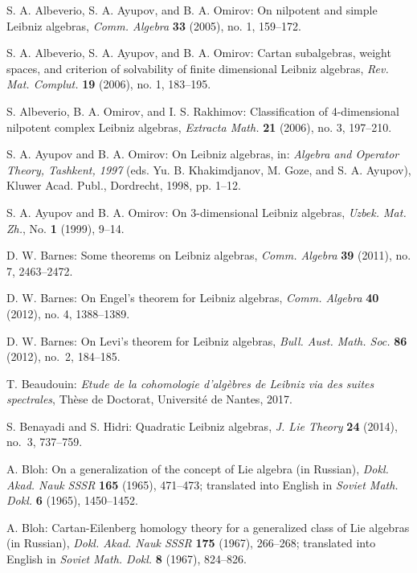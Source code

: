 \documentclass{amsart}
\numberwithin{equation}{section}
\begin{document}
\begin{thebibliography}{99}


S. A. Albeverio, S. A. Ayupov, and B. A. Omirov:
On nilpotent and simple Leibniz algebras,
{\it Comm. Algebra\/} {\bf 33} (2005), no. 1, 159--172.

S. A. Albeverio, S. A. Ayupov, and B. A. Omirov:
Cartan subalgebras, weight spaces, and criterion of solvability of finite dimensional Leibniz algebras,
{\it Rev. Mat. Complut.\/} {\bf 19} (2006), no. 1, 183--195.

S. Albeverio, B. A. Omirov, and I. S. Rakhimov:
Classification of 4-dimensional nilpotent complex Leibniz algebras,
{\it Extracta Math.\/} {\bf 21} (2006), no. 3, 197--210.

S. A. Ayupov and B. A. Omirov:
On Leibniz algebras,
in: {\it Algebra and Operator Theory, Tashkent, 1997\/}
(eds. Yu. B. Khakimdjanov, M. Goze, and S. A. Ayupov),
Kluwer Acad. Publ., Dordrecht, 1998, pp. 1--12.

S. A. Ayupov and B. A. Omirov:
On 3-dimensional Leibniz algebras,
{\it Uzbek. Mat. Zh.\/}, No. {\bf 1} (1999), 9--14.

D. W. Barnes:
Some theorems on Leibniz algebras,
{\it Comm. Algebra\/} {\bf 39} (2011), no. 7, 2463--2472.

D. W. Barnes:
On Engel's theorem for Leibniz algebras,
{\it Comm. Algebra\/} {\bf 40} (2012), no. 4, 1388--1389.

D. W. Barnes:
On Levi's theorem for Leibniz algebras,
{\it Bull. Aust. Math. Soc.\/} {\bf 86} (2012), no.~2, 184--185.

T. Beaudouin:
{\it Etude de la cohomologie d'alg\`ebres de Leibniz via des suites spectrales\/},
Th\`ese de Doctorat, Universit\'e de Nantes, 2017.

S. Benayadi and S. Hidri:
Quadratic Leibniz algebras,
{\it J. Lie Theory\/} {\bf 24} (2014), no.~3, 737--759.

A. Bloh:
On a generalization of the concept of Lie algebra (in Russian),
{\it Dokl. Akad. Nauk SSSR\/} {\bf 165} (1965), 471--473;
translated into English in {\it Soviet Math. Dokl.\/} {\bf 6} (1965), 1450--1452.

A. Bloh:
Cartan-Eilenberg homology theory for a generalized class of Lie algebras (in Russian),
{\it Dokl. Akad. Nauk SSSR\/} {\bf 175} (1967), 266--268;
translated into English in {\it Soviet Math. Dokl.\/} {\bf 8} (1967), 824--826.


\end{thebibliography}
\end{document}
